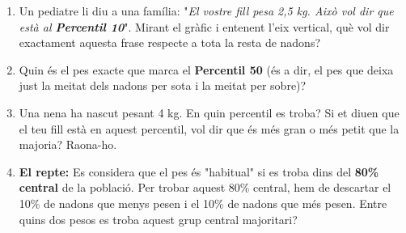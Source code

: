\documentclass[12pt,a4paper]{article}
\begin{document}
\begin{enumerate}[label=\alph*)]
    \item Un pediatre li diu a una família: "\textit{El vostre fill pesa 2,5 kg. Això vol dir que està al \textbf{Percentil 10}}". Mirant el gràfic i entenent l'eix vertical, què vol dir exactament aquesta frase respecte a tota la resta de nadons? \vspace{1cm}
    \item Quin és el pes exacte que marca el \textbf{Percentil 50} (és a dir, el pes que deixa just la meitat dels nadons per sota i la meitat per sobre)? \vspace{1cm}
    \item Una nena ha nascut pesant 4 kg. En quin percentil es troba? Si et diuen que el teu fill està en aquest percentil, vol dir que és més gran o més petit que la majoria? Raona-ho. \vspace{1cm}
    \item \textbf{El repte:} Es considera que el pes és "habitual" si es troba dins del \textbf{80\% central} de la població. Per trobar aquest 80\% central, hem de descartar el 10\% de nadons que menys pesen i el 10\% de nadons que més pesen. Entre quins dos pesos es troba aquest grup central majoritari? \vspace{1cm}
\end{enumerate}
\end{document}
